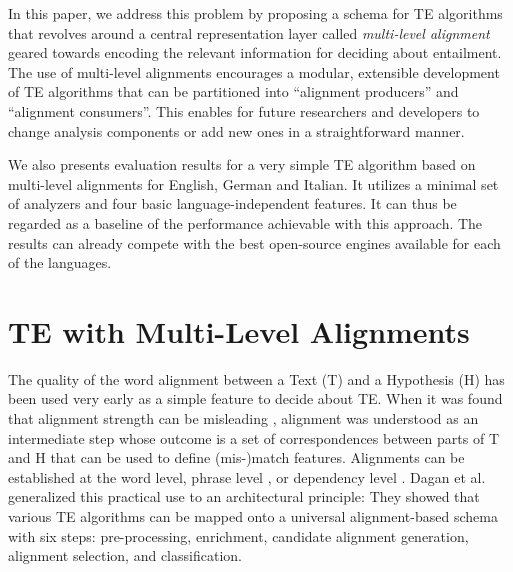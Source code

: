 \documentclass[11pt,letterpaper]{article}
\begin{document}


In this paper, we address this problem by proposing a schema for TE
algorithms that revolves around a central representation layer called
{\em multi-level alignment} geared towards encoding the relevant
information for deciding about entailment. The use of multi-level
alignments encourages a modular, extensible development of TE
algorithms that can be partitioned into ``alignment producers'' and
``alignment consumers''. This enables for future researchers
and developers to change analysis components or add new ones in a
straightforward manner.

We also presents evaluation results for a very simple TE algorithm
based on multi-level alignments for English, German and Italian. It
utilizes a minimal set of analyzers and four basic
language-independent features. It can thus be regarded as a baseline
of the performance achievable with this approach.  The results can
already compete with the best open-source engines available for each
of the languages.

\section{TE with Multi-Level Alignments}

The quality of the word alignment between a Text (T) and a Hypothesis
(H) has been used very early as a simple feature to decide about
TE. When it was found that alignment strength  can be
misleading \cite{maccartney-EtAl:2006:HLT-NAACL06-Main}, alignment was
understood as an intermediate step whose outcome is a set of
correspondences between parts of T and H that can be used to define
(mis-)match features. Alignments can be established at the word level,
phrase level \cite{MacCartney:EMNLP08}, or dependency level
\cite{dinu-wang:2009:EACL}. Dagan et al. 
generalized this practical use to an architectural principle: They
showed that various TE algorithms can be mapped onto a universal
alignment-based schema with six steps: pre-processing, enrichment,
candidate alignment generation, alignment selection, and
classification.
\end{document}

